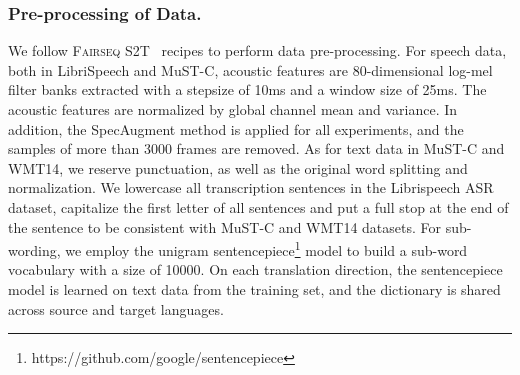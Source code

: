 \documentclass[letterpaper]{article} %
\begin{document}
\subsubsection*{Pre-processing of Data.}
We follow \textsc{Fairseq} S2T~\cite{Wang2020FairseqSF} recipes to perform data pre-processing.
For speech data, both in LibriSpeech and MuST-C, acoustic features are 80-dimensional log-mel filter banks extracted with a stepsize of 10ms and a window size of 25ms.
The acoustic features are normalized by global channel mean and variance.
In addition, the SpecAugment method \cite{Park2019SpecAugmentAS} is applied for all experiments, and the samples of more than 3000 frames are removed.
As for text data in MuST-C and WMT14, we reserve punctuation, as well as the original word splitting and normalization.
We lowercase all transcription sentences in the Librispeech ASR dataset, capitalize the first letter of all sentences and put a full stop at the end of the sentence to be consistent with MuST-C and WMT14 datasets.
For sub-wording, we employ the unigram sentencepiece\footnote{https://github.com/google/sentencepiece} model to build a sub-word vocabulary with a size of 10000.
On each translation direction, the sentencepiece model is learned on text data from the training set, and the dictionary is shared across source and target languages.
\end{document}
